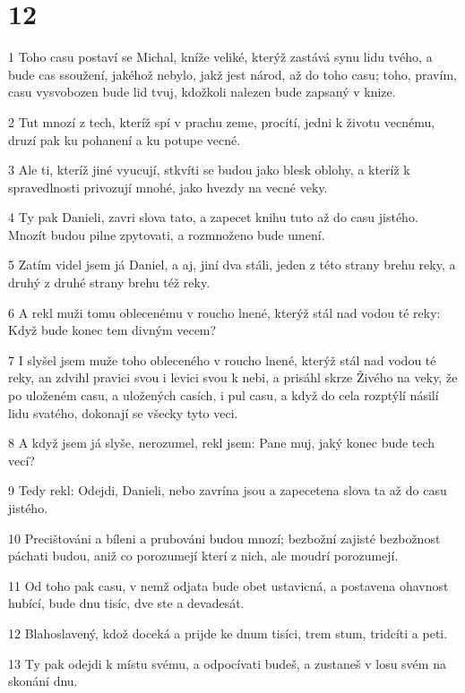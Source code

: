 \chapter{12}

\par 1 Toho casu postaví se Michal, kníže veliké, kterýž zastává synu lidu tvého, a bude cas ssoužení, jakéhož nebylo, jakž jest národ, až do toho casu; toho, pravím, casu vysvobozen bude lid tvuj, kdožkoli nalezen bude zapsaný v knize.
\par 2 Tut mnozí z tech, kteríž spí v prachu zeme, procítí, jedni k životu vecnému, druzí pak ku pohanení a ku potupe vecné.
\par 3 Ale ti, kteríž jiné vyucují, stkvíti se budou jako blesk oblohy, a kteríž k spravedlnosti privozují mnohé, jako hvezdy na vecné veky.
\par 4 Ty pak Danieli, zavri slova tato, a zapecet knihu tuto až do casu jistého. Mnozít budou pilne zpytovati, a rozmnoženo bude umení.
\par 5 Zatím videl jsem já Daniel, a aj, jiní dva stáli, jeden z této strany brehu reky, a druhý z druhé strany brehu též reky.
\par 6 A rekl muži tomu oblecenému v roucho lnené, kterýž stál nad vodou té reky: Když bude konec tem divným vecem?
\par 7 I slyšel jsem muže toho obleceného v roucho lnené, kterýž stál nad vodou té reky, an zdvihl pravici svou i levici svou k nebi, a prisáhl skrze Živého na veky, že po uloženém casu, a uložených casích, i pul casu, a když do cela rozptýlí násilí lidu svatého, dokonají se všecky tyto veci.
\par 8 A když jsem já slyše, nerozumel, rekl jsem: Pane muj, jaký konec bude tech vecí?
\par 9 Tedy rekl: Odejdi, Danieli, nebo zavrína jsou a zapecetena slova ta až do casu jistého.
\par 10 Precištováni a bíleni a prubováni budou mnozí; bezbožní zajisté bezbožnost páchati budou, aniž co porozumejí kterí z nich, ale moudrí porozumejí.
\par 11 Od toho pak casu, v nemž odjata bude obet ustavicná, a postavena ohavnost hubící, bude dnu tisíc, dve ste a devadesát.
\par 12 Blahoslavený, kdož doceká a prijde ke dnum tisíci, trem stum, tridcíti a peti.
\par 13 Ty pak odejdi k místu svému, a odpocívati budeš, a zustaneš v losu svém na skonání dnu.

